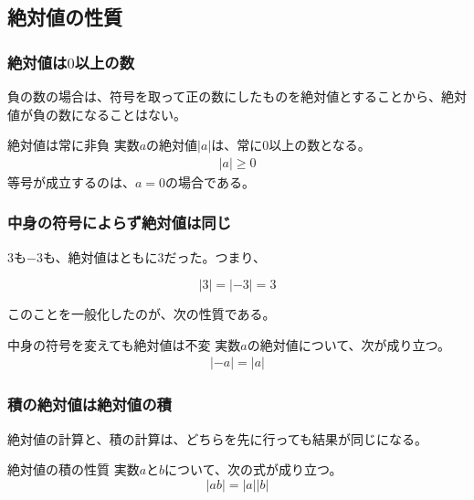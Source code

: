 \documentclass[../../math-imaging]{subfiles}
\begin{document}
\subsection{絶対値の性質}

\subsubsection{絶対値は$0$以上の数}

負の数の場合は、符号を取って正の数にしたものを絶対値とすることから、絶対値が負の数になることはない。

\begin{theorem}{絶対値は常に非負}
  \newline
  実数$a$の絶対値$|a|$は、常に$0$以上の数となる。
  \LARGE
  \begin{align}
    |a| \geq 0
  \end{align}
  \normalsize
  等号が成立するのは、$a=0$の場合である。
\end{theorem}

\subsubsection{中身の符号によらず絶対値は同じ}

$3$も$-3$も、絶対値はともに$3$だった。つまり、

\begin{equation}
  |3| = |-3| = 3
\end{equation}

このことを一般化したのが、次の性質である。

\begin{theorem}{中身の符号を変えても絶対値は不変}
  \newline
  実数$a$の絶対値について、次が成り立つ。
  \LARGE
  \begin{align}
    |-a| = |a|
  \end{align}
\end{theorem}

\subsubsection{積の絶対値は絶対値の積}

絶対値の計算と、積の計算は、どちらを先に行っても結果が同じになる。

\begin{theorem}{絶対値の積の性質}
  \newline
  実数$a$と$b$について、次の式が成り立つ。
  \LARGE
  \begin{equation}
    |a b| = |a||b|
  \end{equation}
\end{theorem}
\end{document}
